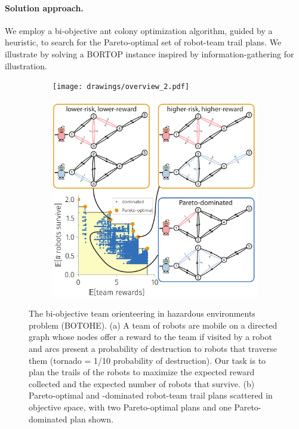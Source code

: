 \documentclass[11pt, oneside]{article}
\begin{document}
\paragraph{Solution approach.} 
We employ a bi-objective ant colony optimization algorithm, guided by a heuristic, to search for the Pareto-optimal set of robot-team trail plans.
We illustrate by solving a BORTOP instance inspired by information-gathering for illustration.

\begin{figure}[h!]
    \centering
     \begin{subfigure}[b]{0.62\textwidth}
    	\texttt{[image: drawings/overview\_2.pdf]}
	\caption{} \label{fig:overview}
    \end{subfigure}
    \begin{subfigure}[b]{0.66\textwidth}
    	\includegraphics[width=\textwidth]{drawings/toy_pareto_front2.pdf}
	\caption{} \label{fig:pareto_optimal}
    \end{subfigure}
    \caption{
      The bi-objective team orienteering in hazardous environments problem (BOTOHE).
      (a) A team of robots are mobile on a directed graph whose 
      nodes offer a reward to the team if visited by a robot and 
      arcs present a probability of destruction to robots that traverse them (tornado = 1/10 probability of destruction). Our task is to plan the trails of the robots to maximize the expected reward collected and the expected number of robots that survive.
      (b) Pareto-optimal and -dominated robot-team trail plans scattered in objective space, with two Pareto-optimal plans and one Pareto-dominated plan shown.}
\end{figure}
\end{document}
